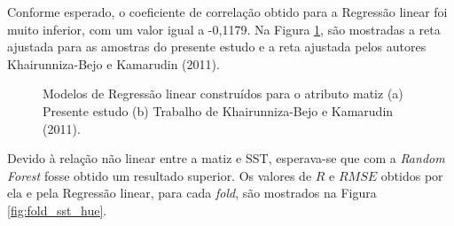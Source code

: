 Conforme esperado, o coeficiente de correlação obtido para a Regressão linear foi muito inferior, com um valor igual a -0,1179. Na Figura \ref{fig:comp_hue}, são mostradas a reta ajustada para as amostras do presente estudo e a reta ajustada pelos autores Khairunniza-Bejo e Kamarudin (2011). 

\begin{figure}[H]
\centering
    \caption{\label{fig:comp_hue} Modelos de Regressão linear construídos para o atributo matiz (a) Presente estudo (b) Trabalho de Khairunniza-Bejo e Kamarudin (2011).}
\end{figure}

Devido à relação não linear entre a matiz e SST, esperava-se que com a \textit{Random Forest} fosse obtido um resultado superior. Os valores de $R$ e $RMSE$ obtidos por ela e pela Regressão linear, para cada \textit{fold}, são mostrados na Figura \ref{fig:fold_sst_hue}.

